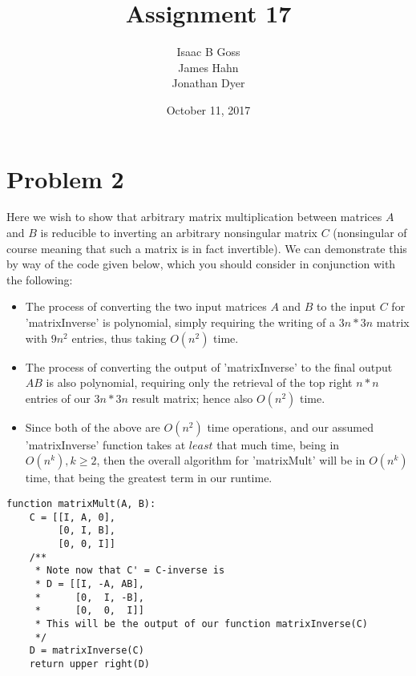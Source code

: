 \documentclass{article}
\author{Isaac B Goss\\ James Hahn\\ Jonathan Dyer}
\title{Assignment 17}
\date{October 11, 2017}
\providecommand{\prob}[1]{\section*{Problem #1}}
\begin{document}
\maketitle

\prob{2}
Here we wish to show that arbitrary matrix multiplication between matrices $A$ and $B$ is reducible to inverting an arbitrary nonsingular matrix $C$ (nonsingular of course meaning that such a matrix is in fact invertible). We can demonstrate this by way of the code given below, which you should consider in conjunction with the following:\par
\begin{itemize}
  \item The process of converting the two input matrices $A$ and $B$ to the input $C$ for 'matrixInverse' is polynomial, simply requiring the writing of a $3n*3n$ matrix with $9n^2$ entries, thus taking $O\left(n^2\right)$ time.
  \item The process of converting the output of 'matrixInverse' to the final output $AB$ is also polynomial, requiring only the retrieval of the top right $n*n$ entries of our $3n*3n$ result matrix; hence also $O\left(n^2\right)$ time.
  \item Since both of the above are $O\left(n^2\right)$ time operations, and our assumed 'matrixInverse' function takes at $least$ that much time, being in $O\left(n^k\right), k \geq 2$, then the overall algorithm for 'matrixMult' will be in $O\left(n^k\right)$ time, that being the greatest term in our runtime.
\end{itemize}


\begin{lstlisting}
function matrixMult(A, B):
    C = [[I, A, 0],
         [0, I, B],
         [0, 0, I]]
    /**
     * Note now that C' = C-inverse is
     * D = [[I, -A, AB],
     *      [0,  I, -B],
     *      [0,  0,  I]]
     * This will be the output of our function matrixInverse(C)
     */
    D = matrixInverse(C)
    return upper right(D)
\end{lstlisting}
\end{document}
